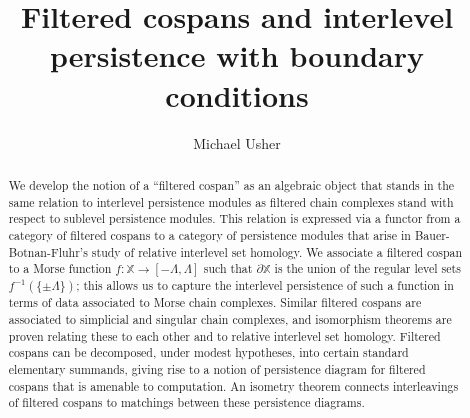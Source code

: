 \documentclass[11pt]{amsart}
\theoremstyle{definition}
\theoremstyle{remark}
\numberwithin{equation}{section}
\begin{document}
	\title{Filtered cospans and interlevel persistence with boundary conditions}
	\author{Michael Usher}
	\address{Department of Mathematics, University of Georgia, 
		Athens, GA 30602}

	\maketitle 

\begin{abstract}
	We develop the notion of a ``filtered cospan'' as an algebraic object that stands in the same relation to interlevel persistence modules as filtered chain complexes stand with respect to sublevel persistence modules.  This relation is expressed via a functor from a category of filtered cospans to a category of persistence modules that arise in Bauer-Botnan-Fluhr's study of relative interlevel set homology. We associate a filtered cospan to a Morse function $f:\mathbb{X}\to [-\Lambda,\Lambda]$ such that $\partial \mathbb{X}$ is the union of the regular level sets $f^{-1}(\{\pm\Lambda\})$; this allows us to capture the interlevel persistence of such a function in terms of data associated to Morse chain complexes. Similar filtered cospans are associated to simplicial and singular chain complexes, and isomorphism theorems are proven relating these to each other and to relative interlevel set homology. Filtered cospans can be decomposed, under modest hypotheses, into certain standard elementary summands, giving rise to a notion of persistence diagram for filtered cospans that is amenable to computation.  An isometry theorem connects interleavings of filtered cospans to matchings between these persistence diagrams.
\end{abstract}
\end{document}

